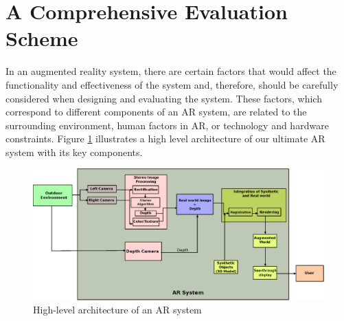 
\section{A Comprehensive Evaluation Scheme}

In an augmented reality system, there are certain factors that would affect the functionality and effectiveness of the system \cite{liv05,kru10} and, therefore, 
should be carefully considered when designing and evaluating the system.
These factors, which correspond to different components of an AR system, are related to the surrounding 
environment, human factors in AR, or technology and hardware constraints.
Figure \ref{fig:AR} illustrates a high level architecture of our ultimate AR system with its key components.

\begin{figure}[H]
\centering
\includegraphics[scale=0.75]{AR}
\caption{High-level architecture of an AR system}
\label{fig:AR}
\end{figure} 


